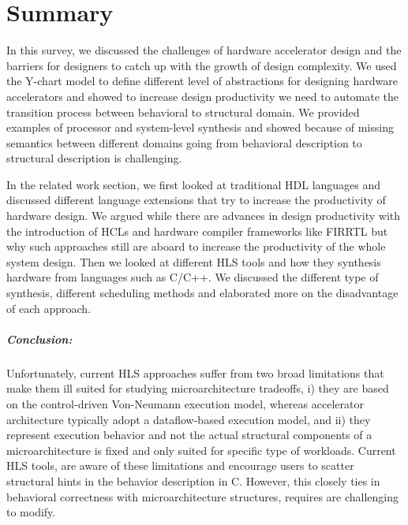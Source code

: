 
\chapter{Summary}

In this survey, we discussed the challenges of hardware accelerator design and the barriers for designers to catch up with the growth of design complexity.
We used the Y-chart model to define different level of abstractions for designing hardware accelerators and showed to increase design productivity we need to automate the transition process between behavioral to structural domain.
We provided examples of processor and system-level synthesis and showed because of missing semantics between different domains going from behavioral description to structural description is challenging.

In the related work section, we first looked at traditional HDL languages and discussed different language extensions that try to increase the productivity of hardware design.
We argued while there are advances in design productivity with the introduction of HCLs and hardware compiler frameworks like FIRRTL but why such approaches still are aboard to increase the productivity of the whole system design.
Then we looked at different HLS tools and how they synthesis hardware from languages such as C/C++.
We discussed the different type of synthesis, different scheduling methods and elaborated more on the disadvantage of each approach.

\paragraph{Conclusion:}
Unfortunately, current HLS approaches suffer from two broad limitations that make them ill suited for studying microarchitecture tradeoffs, i) they are based on the control-driven Von-Neumann execution  model,  whereas  accelerator  architecture  typically adopt a dataflow-based execution model, and ii) they represent execution behavior and not the actual structural components of a microarchitecture is fixed and only suited for specific type of workloads.
Current HLS tools, are aware of these limitations and encourage users to scatter structural hints in the behavior description in C. However, this closely ties in behavioral correctness with microarchitecture structures, requires are challenging to modify.